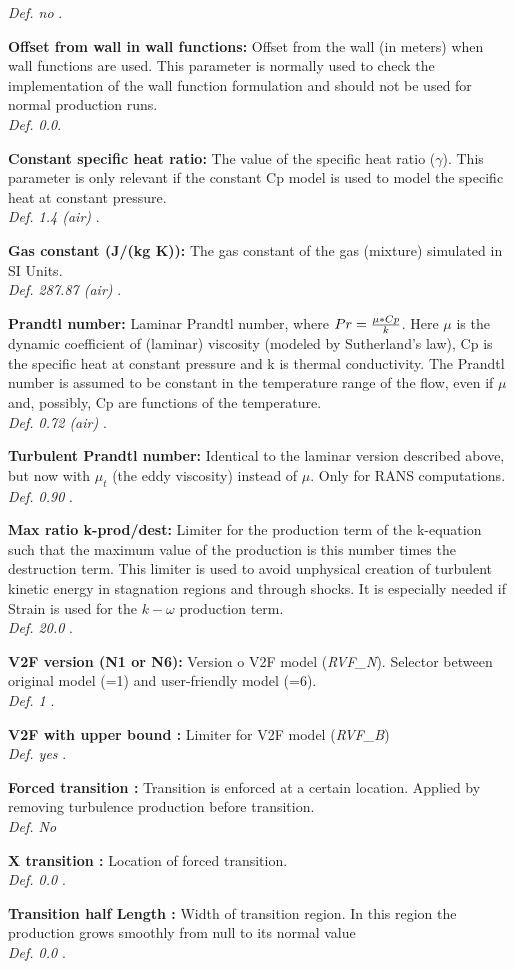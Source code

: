 \documentclass[12pt,epsf,colordvi]{article}
\begin{document}
\begin{description}
   {\it Def. no }.
%
    \item{ \bf Offset from wall in wall functions: } Offset from the wall (in meters) when wall functions are used. This parameter is normally used to check the implementation of the wall function formulation and should not be used for normal production runs. \\
   {\it Def. 0.0}.
%
     \item{ \bf Constant specific heat ratio:} The value of the specific heat ratio (\(\gamma\)). This parameter is only relevant if the constant Cp model is used to model the specific heat at constant pressure.\\
   {\it Def. 1.4 (air)  }.
%
    \item{ \bf  Gas constant (J/(kg K)):} The gas constant of the gas (mixture) simulated in SI Units.\\
   {\it Def. 287.87 (air)  }. 
%
    \item{ \bf  Prandtl number:}  Laminar Prandtl number, where \(Pr = {{\mu*Cp} \over k}\). Here \(\mu\) is the dynamic coefficient of (laminar) viscosity (modeled by Sutherland's law), Cp is the specific heat at constant pressure and k is thermal conductivity. The Prandtl number is assumed to be constant in the temperature range of the flow, even if \(\mu\) and, possibly, Cp are functions of the temperature.\\
   {\it Def. 0.72 (air)  }. 
%
    \item{ \bf  Turbulent Prandtl number:} Identical to the laminar version described above, but now with \(\mu_t \) (the eddy viscosity) instead of \(\mu\). Only for RANS computations. \\
   {\it Def. 0.90  }.
%
     \item{ \bf  Max ratio k-prod/dest: } Limiter for the production term of the k-equation such that the maximum value of the production is this number times the destruction term. This limiter is used to avoid unphysical creation of turbulent kinetic energy in stagnation regions and through shocks. It is especially needed if Strain is used for the \(k-\omega\) production term. \\
   {\it Def. 20.0  }.
%
	\item{\bf V2F version (N1 or N6): } Version o V2F model ({\it RVF\_N}). Selector between original model (=1) and user-friendly model (=6).  \\ 
{\it Def.  1 }.
%
	\item{\bf V2F with upper bound :} Limiter for V2F model ({\it RVF\_B}) \\
 {\it Def.  yes }.
%
  \item{\bf Forced transition  : } Transition is enforced at a certain location. Applied by removing turbulence production before transition. \\
	{\it Def.  No}
% 
  \item{ \bf  X transition : } Location of forced transition. \\
	{\it Def.  0.0 }.
%
    \item{ \bf  Transition half Length : } Width of transition region. In this region the production grows smoothly from null to its normal value \\
	 {\it Def.  0.0 }.
%


\end{description}
\end{document}
